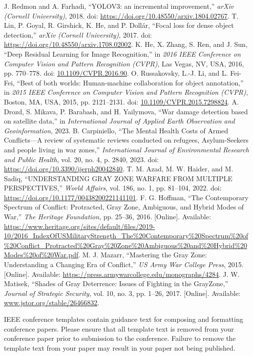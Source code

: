 \documentclass[conference]{IEEEtran}
\begin{document}
\begin{thebibliography}{00}
 J. Redmon and A. Farhadi, ``YOLOV3: an incremental improvement,'' \textit{arXiv (Cornell University)}, 2018. doi: \url{https://doi.org/10.48550/arxiv.1804.02767}.
 T. Lin, P. Goyal, R. Girshick, K. He, and P. Dollár, ``Focal loss for dense object detection,'' \textit{arXiv (Cornell University)}, 2017. doi: \url{https://doi.org/10.48550/arxiv.1708.02002}.
 K. He, X. Zhang, S. Ren, and J. Sun, ``Deep Residual Learning for Image Recognition,'' in \textit{2016 IEEE Conference on Computer Vision and Pattern Recognition (CVPR)}, Las Vegas, NV, USA, 2016, pp. 770--778. doi: \url{10.1109/CVPR.2016.90}.
 O. Russakovsky, L.-J. Li, and L. Fei-Fei, ``Best of both worlds: Human-machine collaboration for object annotation,'' in \textit{2015 IEEE Conference on Computer Vision and Pattern Recognition (CVPR)}, Boston, MA, USA, 2015, pp. 2121--2131. doi: \url{10.1109/CVPR.2015.7298824}.
 A. Drozd, S. Mikava, P. Barabash, and H. Yailymova, ``War damage detection based on satellite data,'' in \textit{International Journal of Applied Earth Observation and Geoinformation}, 2023.
 B. Carpiniello, ``The Mental Health Costs of Armed Conflicts—A review of systematic reviews conducted on refugees, Asylum-Seekers and people living in war zones,'' \textit{International Journal of Environmental Research and Public Health}, vol. 20, no. 4, p. 2840, 2023. doi: \url{https://doi.org/10.3390/ijerph20042840}.
 T. M. Azad, M. W. Haider, and M. Sadiq, ``UNDERSTANDING GRAY ZONE WARFARE FROM MULTIPLE PERSPECTIVES,'' \textit{World Affairs}, vol. 186, no. 1, pp. 81--104, 2022. doi: \url{https://doi.org/10.1177/00438200221141101}.
 F. G. Hoffman, ``The Contemporary Spectrum of Conflict: Protracted, Gray Zone, Ambiguous, and Hybrid Modes of War,'' \textit{The Heritage Foundation}, pp. 25--36, 2016. [Online]. Available: \url{https://www.heritage.org/sites/default/files/2019-10/2016_IndexOfUSMilitaryStrength_The%20Contemporary%20Spectrum%20of%20Conflict_Protracted%20Gray%20Zone%20Ambiguous%20and%20Hybrid%20Modes%20of%20War.pdf}.
 M. J. Mazarr, ``Mastering the Gray Zone: Understanding a Changing Era of Conflict,'' \textit{US Army War College Press}, 2015. [Online]. Available: \url{https://press.armywarcollege.edu/monographs/4284}.
 J. W. Matisek, ``Shades of Gray Deterrence: Issues of Fighting in the GrayZone,'' \textit{Journal of Strategic Security}, vol. 10, no. 3, pp. 1--26, 2017. [Online]. Available: \url{www.jstor.org/stable/26466832}.
\end{thebibliography}

\vspace{12pt}
\color{red}
IEEE conference templates contain guidance text for composing and formatting conference papers. Please ensure that all template text is removed from your conference paper prior to submission to the conference. Failure to remove the template text from your paper may result in your paper not being published.
\end{document}
